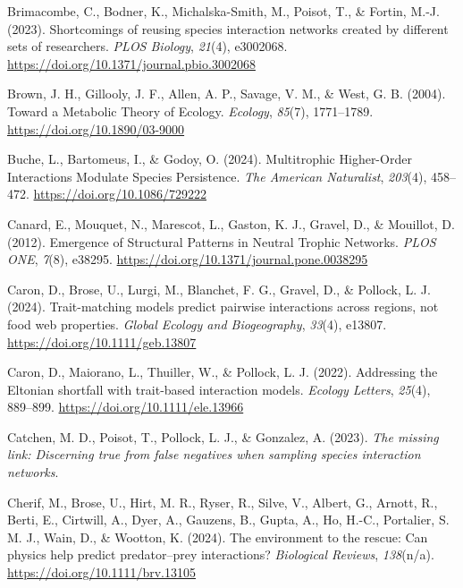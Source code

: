 \documentclass[
]{article}
\newlength{\cslhangindent}
\newenvironment{CSLReferences}[2] %
 {\begin{list}{}{%
  \setlength{\itemindent}{0pt}
  \setlength{\leftmargin}{0pt}
  \setlength{\parsep}{0pt}
  \ifodd #1
   \setlength{\leftmargin}{\cslhangindent}
   \setlength{\itemindent}{-1\cslhangindent}
  \fi
  \setlength{\itemsep}{#2\baselineskip}}}
 {\end{list}}
\begin{document}
\begin{CSLReferences}{1}{0}
Brimacombe, C., Bodner, K., Michalska-Smith, M., Poisot, T., \& Fortin,
M.-J. (2023). Shortcomings of reusing species interaction networks
created by different sets of researchers. \emph{PLOS Biology},
\emph{21}(4), e3002068.
\url{https://doi.org/10.1371/journal.pbio.3002068}

Brown, J. H., Gillooly, J. F., Allen, A. P., Savage, V. M., \& West, G.
B. (2004). Toward a {Metabolic Theory} of {Ecology}. \emph{Ecology},
\emph{85}(7), 1771--1789. \url{https://doi.org/10.1890/03-9000}

Buche, L., Bartomeus, I., \& Godoy, O. (2024). Multitrophic
{Higher-Order Interactions Modulate Species Persistence}. \emph{The
American Naturalist}, \emph{203}(4), 458--472.
\url{https://doi.org/10.1086/729222}

Canard, E., Mouquet, N., Marescot, L., Gaston, K. J., Gravel, D., \&
Mouillot, D. (2012). Emergence of {Structural Patterns} in {Neutral
Trophic Networks}. \emph{PLOS ONE}, \emph{7}(8), e38295.
\url{https://doi.org/10.1371/journal.pone.0038295}

Caron, D., Brose, U., Lurgi, M., Blanchet, F. G., Gravel, D., \&
Pollock, L. J. (2024). Trait-matching models predict pairwise
interactions across regions, not food web properties. \emph{Global
Ecology and Biogeography}, \emph{33}(4), e13807.
\url{https://doi.org/10.1111/geb.13807}

Caron, D., Maiorano, L., Thuiller, W., \& Pollock, L. J. (2022).
Addressing the {Eltonian} shortfall with trait-based interaction models.
\emph{Ecology Letters}, \emph{25}(4), 889--899.
\url{https://doi.org/10.1111/ele.13966}

Catchen, M. D., Poisot, T., Pollock, L. J., \& Gonzalez, A. (2023).
\emph{The missing link: Discerning true from false negatives when
sampling species interaction networks}.

Cherif, M., Brose, U., Hirt, M. R., Ryser, R., Silve, V., Albert, G.,
Arnott, R., Berti, E., Cirtwill, A., Dyer, A., Gauzens, B., Gupta, A.,
Ho, H.-C., Portalier, S. M. J., Wain, D., \& Wootton, K. (2024). The
environment to the rescue: Can physics help predict predator--prey
interactions? \emph{Biological Reviews}, \emph{138}(n/a).
\url{https://doi.org/10.1111/brv.13105}


\end{CSLReferences}
\end{document}

